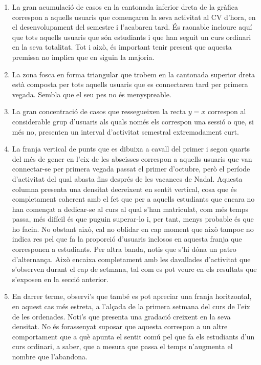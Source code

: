 \documentclass[
	a4paper,
	twoside,
	justified
]{tufte-book}
\begin{document}
\begin{enumerate}[(1)]  

\item La gran acumulació de casos en la cantonada inferior dreta de la gràfica correspon a aquells usuaris que començaren la seva activitat al CV d'hora, en el desenvolupament del semestre i l'acabaren tard. És raonable incloure aquí que tots aquells usuaris que són estudiants i que han seguit un curs ordinari en la seva totalitat. Tot i això, és important tenir present que aquesta premissa no implica que en siguin la majoria.

\item La zona fosca en forma triangular que trobem en la cantonada superior dreta està composta per tots aquells usuaris que es connectaren tard per primera vegada. Sembla que el seu pes no és menyspreable. 

\item La gran concentració de casos que ressegueixen la recta $y = x$ correspon al considerable grup d'usuaris als quals només els correspon una sessió o que, si més no, presenten un interval d'activitat semestral extremadament curt.

\item La franja vertical de punts que es dibuixa a cavall del primer i segon quarts del més de gener en l'eix de les abscisses correspon a aquells usuaris que van connectar-se per primera vegada passat el primer d'octubre, però el període d'activitat del qual abasta fins després de les vacances de Nadal. Aquesta columna presenta una densitat decreixent en sentit vertical, cosa que és completament coherent amb el fet que per a aquells estudiants que encara no han començat a dedicar-se al curs al qual s'han matriculat, com més temps passa, més difícil és que puguin superar-lo i, per tant, menys probable és que ho facin. No obstant això, cal no oblidar en cap moment que això tampoc no indica res pel que fa la proporció d'usuaris inclosos en aquesta franja que corresponen a estudiants. Per altra banda, notis que s'hi dóna un patro d'alternança. Això encaixa completament amb les davallades d'activitat que s'observen durant el cap de setmana, tal com es pot veure en els resultats que s'exposen en la secció anterior.

\item En darrer terme, observi's que també es pot apreciar una franja horitzontal, en aquest cas més estreta, a l'alçada de la primera setmana del curs de l'eix de les ordenades. Noti's que presenta una gradació creixent en la seva densitat. No és forassenyat suposar que aquesta correspon a un altre comportament que a què apunta el sentit comú pel que fa els estudiants d'un curs ordinari, a saber, que a mesura que passa el temps n'augmenta el nombre que l'abandona.
      
\end{enumerate}
\end{document}
